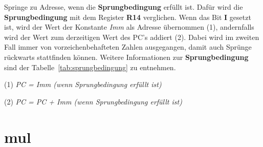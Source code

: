 Springe zu Adresse, wenn die \textbf{Sprungbedingung} erfüllt ist. Dafür wird die
\textbf{Sprungbedingung} mit dem Register \textbf{R14} verglichen. Wenn das Bit
\textbf{I} gesetzt ist, wird der Wert der Konstante \textit{Imm} als Adresse
übernommen (1), andernfalls wird der Wert zum derzeitigen Wert des PC's addiert
(2). Dabei wird im zweiten Fall immer von vorzeichenbehafteten Zahlen
ausgegangen, damit auch Sprünge rückwarts stattfinden können. Weitere
Informationen zur \textbf{Sprungbedingung} sind der
Tabelle~\ref{tab:sprungbedingung} zu entnehmen.

(1) \textit{PC = Imm (wenn Sprungbedingung erfüllt ist)}

(2) \textit{PC = PC + Imm (wenn Sprungbedingung erfüllt ist)}
\section*{mul}
